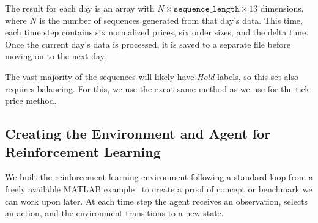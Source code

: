 \documentclass[a4paper,oneside,onecolumn,12pt]{book}
\begin{document}
		The result for each day is an array with $N \times \texttt{sequence\_length} \times 13$ dimensions, where $N$ is the number of sequences generated from that day's data. This time, each time step contains six normalized prices, six order sizes, and the delta time. Once the current day's data is processed, it is saved to a separate file before moving on to the next day.

		The vast majority of the sequences will likely have \textit{Hold} labels, so this set also requires balancing. For this, we use the excat same method as we use for the tick price method.

	\subsection{Creating the Environment and Agent for Reinforcement Learning}
	We built the reinforcement learning environment following a standard loop from a freely available MATLAB example~\cite{DRLOTE} to create a proof of concept or benchmark we can work upon later. At each time step the agent receives an observation, selects an action, and the environment transitions to a new state.
\end{document}
